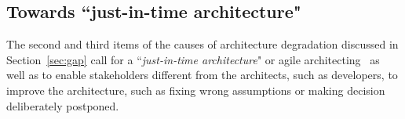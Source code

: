 %



\subsection{Towards ``just-in-time architecture"}

The second and third items of the causes of architecture degradation discussed in Section~\ref{sec:gap} 
call for a ``{\em just-in-time architecture}" or agile architecting~\cite{shahrokni2016organic}  as well as to enable stakeholders different from the architects, such as developers, to improve the architecture, such as fixing wrong assumptions or making decision deliberately postponed.

